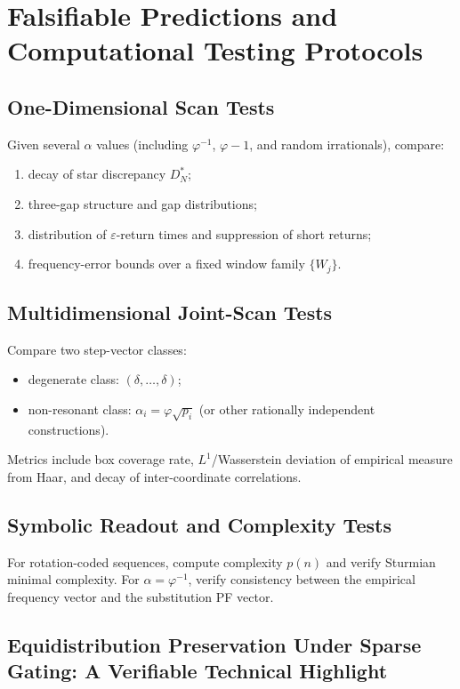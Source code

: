 ﻿\section{Falsifiable Predictions and Computational Testing Protocols}

\subsection{One-Dimensional Scan Tests}

Given several $\alpha$ values (including $\varphi^{-1}$, $\varphi-1$, and random irrationals), compare:
\begin{enumerate}
  \item decay of star discrepancy $D_N^*$;
  \item three-gap structure and gap distributions;
  \item distribution of $\varepsilon$-return times and suppression of short returns;
  \item frequency-error bounds over a fixed window family $\{W_j\}$.
\end{enumerate}

\subsection{Multidimensional Joint-Scan Tests}

Compare two step-vector classes:
\begin{itemize}
  \item degenerate class: $(\delta,\dots,\delta)$;
  \item non-resonant class: $\alpha_i=\varphi\sqrt{p_i}$ (or other rationally independent constructions).
\end{itemize}
Metrics include box coverage rate, $L^1$/Wasserstein deviation of empirical measure from Haar, and decay of inter-coordinate correlations.

\subsection{Symbolic Readout and Complexity Tests}

For rotation-coded sequences, compute complexity $p(n)$ and verify Sturmian minimal complexity. For $\alpha=\varphi^{-1}$, verify consistency between the empirical frequency vector and the substitution PF vector.

\subsection{Equidistribution Preservation Under Sparse Gating: A Verifiable Technical Highlight}

